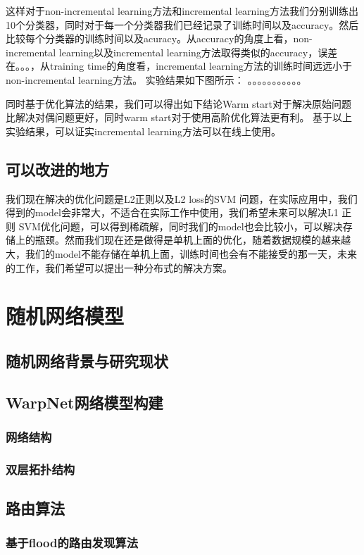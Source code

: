 \documentclass[master]{njuthesis}
\begin{document}
这样对于non-incremental learning方法和incremental learning方法我们分别训练出10个分类器，同时对于每一个分类器我们已经记录了训练时间以及accuracy。然后比较每个分类器的训练时间以及acuracy。从accuracy的角度上看，non-incremental learning以及incremental learning方法取得类似的accuracy，误差在。。。，从training time的角度看，incremental learning方法的训练时间远远小于non-incremental learning方法。
实验结果如下图所示：
。。。。。。。。。。。

同时基于优化算法的结果，我们可以得出如下结论Warm start对于解决原始问题比解决对偶问题更好，同时warm start对于使用高阶优化算法更有利。
基于以上实验结果，可以证实incremental learning方法可以在线上使用。

\section{可以改进的地方}
我们现在解决的优化问题是L2正则以及L2 loss的SVM 问题，在实际应用中，我们得到的model会非常大，不适合在实际工作中使用，我们希望未来可以解决L1 正则 SVM优化问题，可以得到稀疏解，同时我们的model也会比较小，可以解决存储上的瓶颈。然而我们现在还是做得是单机上面的优化，随着数据规模的越来越大，我们的model不能存储在单机上面，训练时间也会有不能接受的那一天，未来的工作，我们希望可以提出一种分布式的解决方案。
\chapter{随机网络模型}\label{chapter_random}
\section{随机网络背景与研究现状}
\Blindtext
\section{WarpNet网络模型构建}\label{sec:warpnet_construction}
\subsection{网络结构}
\Blindtext
\subsection{双层拓扑结构}
\Blindtext
\section{路由算法}
\subsection{基于flood的路由发现算法}
\Blindtext
\end{document}
